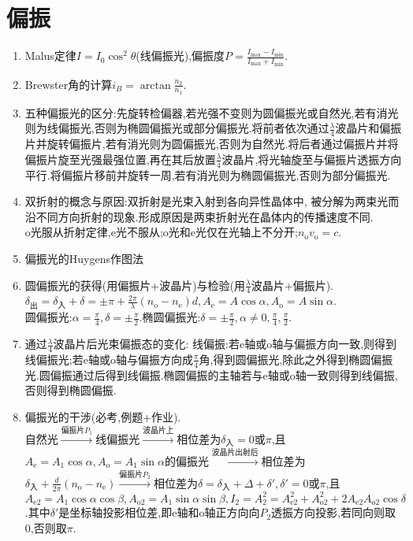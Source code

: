 \documentclass{article}
\begin{document}
\section{偏振}
\begin{enumerate}
    \item Malus定律$I=I_0\cos^2\theta$(线偏振光),偏振度$P=\frac{I_{\max}-I_{\min}}{I_{\max}+I_{\min}}$.
    \item Brewster角的计算$i_B=\arctan\frac{n_2}{n_1}$.
    \item 五种偏振光的区分:先旋转检偏器,若光强不变则为圆偏振光或自然光,若有消光则为线偏振光,否则为椭圆偏振光或部分偏振光.将前者依次通过$\frac{\lambda}{4}$波晶片和偏振片并旋转偏振片,若有消光则为圆偏振光,否则为自然光.将后者通过偏振片并将偏振片旋至光强最强位置,再在其后放置$\frac{\lambda}{4}$波晶片,将光轴旋至与偏振片透振方向平行.将偏振片移前并旋转一周,若有消光则为椭圆偏振光,否则为部分偏振光.
    \item 双折射的概念与原因:双折射是光束入射到各向异性晶体中, 被分解为两束光而沿不同方向折射的现象.形成原因是两束折射光在晶体内的传播速度不同.\\
    o光服从折射定律,e光不服从;o光和e光仅在光轴上不分开;$n_{\text{o}}v_{\text{o}}=c$.
    \item 偏振光的Huygens作图法
    \item 圆偏振光的获得(用偏振片+波晶片)与检验(用$\frac{\lambda}{4}$波晶片+偏振片).\\
    $\delta_{出}=\delta_{入}+\delta=\pm\pi+\frac{2\pi}{\lambda}(n_{\text{o}}-n_{\text{e}})d, A_{\text{e}}=A\cos\alpha, A_{\text{o}}=A\sin\alpha$.\\
    圆偏振光:$\alpha=\frac{\pi}{4},\delta=\pm\frac{\pi}{2}$.椭圆偏振光:$\delta=\pm\frac{\pi}{2},\alpha\neq 0,\frac{\pi}{4},\frac{\pi}{2}$.
    \item 通过$\frac{\lambda}{4}$波晶片后光束偏振态的变化:    线偏振:若e轴或o轴与偏振方向一致,则得到线偏振光;若e轴或o轴与偏振方向成$\frac{\pi}{4}$角,得到圆偏振光,除此之外得到椭圆偏振光.圆偏振通过后得到线偏振.椭圆偏振的主轴若与e轴或o轴一致则得到线偏振,否则得到椭圆偏振.
    \item 偏振光的干涉(必考,例题+作业).\\
    自然光$\overset{偏振片P_1}{\to}$线偏振光$\overset{波晶片上}{\to}$相位差为$\delta_{\text{入}}=0$或$\pi$,且$A_{\text{e}}=A_1\cos \alpha, A_{\text{o}}=A_1\sin\alpha$的偏振光$\overset{波晶片出射后}{\to}$相位差为$\delta_{\text{入}}+\frac{d}{2\pi}(n_{\text{o}}-n_{\text{e}})\overset{偏振片P_2}{\to}$相位差为$\delta=\delta_{\text{入}}+\Delta+\delta',\delta'=0$或$\pi$,且$A_{\text{e}2}=A_1\cos\alpha\cos\beta, A_{\text{o}2}=A_1\sin\alpha\sin\beta, I_2=A_2^2=A_{\text{e}2}^2+A_{\text{o}2}^2+2A_{\text{e}2}A_{\text{o}2}\cos\delta$.其中$\delta'$是坐标轴投影相位差,即e轴和o轴正方向向$P_2$透振方向投影,若同向则取0,否则取$\pi$.\\

\end{enumerate}
\end{document}
